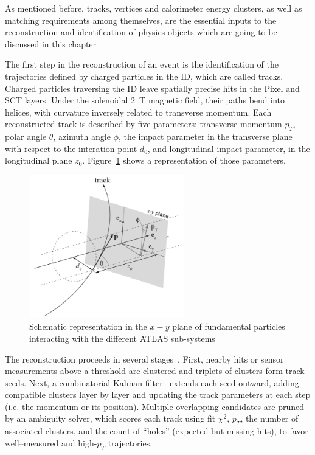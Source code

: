 As mentioned before, tracks, vertices and calorimeter energy clusters, as well as matching requirements among themselves, are the essential inputs to the reconstruction and identification of physics objects which are going to be discussed in this chapter

The first step in the reconstruction of an event is the identification of the trajectories defined by charged particles in the ID, which are called tracks.
Charged particles traversing the ID leave spatially precise hits in the Pixel and SCT layers. Under the solenoidal 2~T magnetic field, their paths bend into helices, with curvature inversely related to transverse momentum. 
Each reconstructed track is described by five parameters: transverse momentum \(p_T\), polar angle \(\theta\), azimuth angle \(\phi\), the impact parameter in the transverse plane with respect to the interation point \(d_0\), and longitudinal impact parameter, in the longitudinal plane \(z_0\). Figure~\ref{fig:tracks} shows a representation of those parameters.

\begin{figure}[htbp]
  \centering
  \includegraphics[width=0.6\textwidth]{images/tracks.png}
  \caption{Schematic representation in the $x-y$ plane of fundamental particles interacting with the different ATLAS sub-systems~\cite{Bianchi:2837191}}
  \label{fig:tracks}
 \end{figure}

The reconstruction proceeds in several stages~\cite{tracks}. First, nearby hits or sensor measurements above a threshold are clustered and triplets of clusters form track seeds. Next, a combinatorial Kalman filter~\cite{kalman} extends each seed outward, adding compatible clusters layer by layer and updating the track parameters at each step (i.e. the momentum or its position). Multiple overlapping candidates are pruned by an ambiguity solver, which scores each track using fit \(\chi^2\), \(p_T\), the number of associated clusters, and the count of “holes” (expected but missing hits), to favor well–measured and high-\(p_T\) trajectories.

